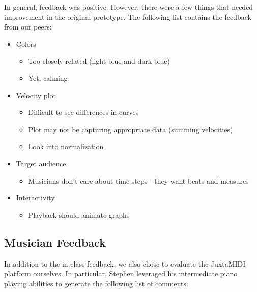 \documentclass[journal]{vgtc}                %
\begin{document}
In general, feedback was positive. However, there were a few things
that needed improvement in the original prototype. The following
list contains the feedback from our peers:

\begin{itemize}
  \item Colors
  \begin{itemize}
    \item Too closely related (light blue and dark blue)
    \item Yet, calming
  \end{itemize}
  \item Velocity plot
  \begin{itemize}
    \item Difficult to see differences in curves
    \item Plot may not be capturing appropriate data (summing velocities)
    \item Look into normalization
  \end{itemize}
  \item Target audience
  \begin{itemize}
    \item Musicians don't care about time steps - they want beats and measures
  \end{itemize}
  \item Interactivity
  \begin{itemize}
    \item Playback should animate graphs
  \end{itemize}
\end{itemize}

\subsection{Musician Feedback}

In addition to the in class feedback, we also chose to evaluate the JuxtaMIDI
platform ourselves. In particular, Stephen leveraged his intermediate piano
playing abilities to generate the following list of comments:
\end{document}
